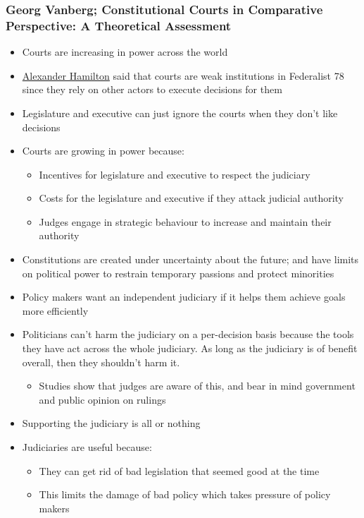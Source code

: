 \documentclass[11pt]{article}
\begin{document}
\subsubsection{Georg Vanberg; Constitutional Courts in Comparative Perspective:  A Theoretical Assessment}
\label{sec:orgceeaa3d}
\begin{itemize}
\item Courts are increasing in power across the world
\item \href{20200529195156-alexander\_hamilton.org}{Alexander Hamilton} said that courts are weak institutions in Federalist 78
since they rely on other actors to execute decisions for them
\item Legislature and executive can just ignore the courts when they don't like decisions
\item Courts are growing in power because:
\begin{itemize}
\item Incentives for legislature and executive to respect the judiciary
\item Costs for the legislature and executive if they attack judicial authority
\item Judges engage in strategic behaviour to increase and maintain their authority
\end{itemize}
\item Constitutions are created under uncertainty about the future; and have limits
on political power to restrain temporary passions and protect minorities
\item Policy makers want an independent judiciary if it helps them achieve goals
more efficiently
\item Politicians can't harm the judiciary on a per-decision basis because the tools
they have act across the whole judiciary. As long as the judiciary is of
benefit overall, then they shouldn't harm it.
\begin{itemize}
\item Studies show that judges are aware of this, and bear in mind government and
public opinion on rulings
\end{itemize}
\item Supporting the judiciary is all or nothing
\item Judiciaries are useful because:
\begin{itemize}
\item They can get rid of bad legislation that seemed good at the time
\item This limits the damage of bad policy which takes pressure of policy makers

\end{itemize}
\end{itemize}
\end{document}
